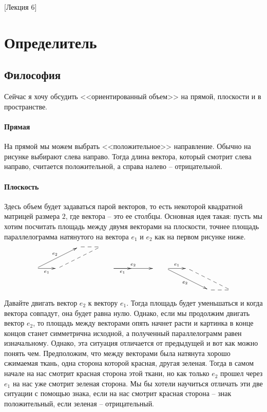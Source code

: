 [Лекция 6]
\newpage
\section{Определитель}

\subsection{Философия}

Сейчас я хочу обсудить <<ориентированный объем>> на прямой, плоскости и в пространстве. 

\paragraph{Прямая}

 На прямой мы можем выбрать <<положительное>> направление. Обычно на рисунке выбирают слева направо. Тогда длина вектора, который смотрит слева направо, считается положительной, а справа налево -- отрицательной.

\paragraph{Плоскость}

Здесь объем будет задаваться парой векторов, то есть некоторой квадратной матрицей размера $2$, где вектора -- это ее столбцы. Основная идея такая: пусть мы хотим посчитать площадь между двумя векторами на плоскости, точнее площадь параллелограмма натянутого на вектора $e_1$ и $e_2$ как на первом рисунке ниже.
\[
\xymatrix{
	{}&{}&{}\ar@{--}[r]&{}\\
	{}\ar[urr]^{e_2}\ar[r]_{e_1}&{}\ar@{--}[urr]&{}&{}\\
	{}&{}&{}&{}\\
}\quad
\xymatrix{
	{}&{}&{}\\
	{}\ar[rr]^{e_2}\ar[r]_{e_1}&{}&{}\\
	{}&{}&{}\\
}\quad
\xymatrix{
	{}&{}&{}&{}\\
	{}\ar[drr]_{e_2}\ar[r]^{e_1}&{}\ar@{--}[drr]&{}&{}\\
	{}&{}&{}\ar@{--}[r]&{}\\
}
\]
Давайте двигать вектор $e_2$ к вектору $e_1$. Тогда площадь будет уменьшаться и когда вектора совпадут, она будет равна нулю. Однако, если мы продолжим двигать вектор $e_2$, то площадь между векторами опять начнет расти и картинка в конце концов станет симметрична исходной, а полученный параллелограмм равен изначальному. Однако, эта ситуация отличается от предыдущей и вот как можно понять чем. Предположим, что между векторами была натянута хорошо сжимаемая ткань, одна сторона которой красная, другая зеленая. Тогда в самом начале на нас смотрит красная сторона этой ткани, но как только $e_2$ прошел через $e_1$ на нас уже смотрит зеленая сторона. Мы бы хотели научиться отличать эти две ситуации с помощью знака, если на  нас смотрит красная сторона -- знак положительный, если зеленая -- отрицательный. 

